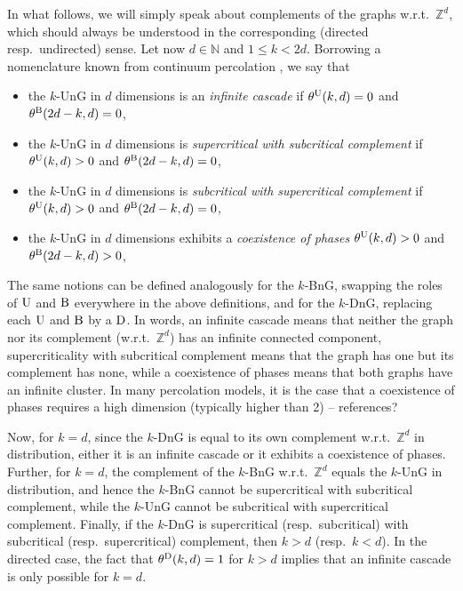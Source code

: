 \documentclass{article}
\newcommand{\N}{\mathbb{N}}
\theoremstyle{definition}
\newcommand{\1}{\mathbbm{1}}
\newcommand{\0}{\mathbf{o}}
\newcommand{\Z}{\mathbb{Z}}
\begin{document}
In what follows, we will simply speak about complements of the graphs w.r.t.\ $\Z^d$, which should always be understood in the corresponding (directed resp.\ undirected) sense. Let now $d \in \N$ and $1 \leq k < 2d$. Borrowing a nomenclature known from continuum percolation \cite[Section 7.3]{MeesterRoy1996}, we say that 
\begin{itemize}
    \item the $k$-UnG in $d$ dimensions is an \emph{infinite cascade} if $\theta^{\rm U}(k,d)=0$ and $\theta^{\rm B}(2d-k,d)=0$,
    \item the $k$-UnG in $d$ dimensions is \emph{supercritical with subcritical complement} if $\theta^{\rm U}(k,d)>0$ and $\theta^{\rm B}(2d-k,d)=0$,
    \item the $k$-UnG in $d$ dimensions is \emph{subcritical with supercritical complement} if $\theta^{\rm U}(k,d)>0$ and $\theta^{\rm B}(2d-k,d)=0$,
    \item the $k$-UnG in $d$ dimensions exhibits a \emph{coexistence of phases} $\theta^{\rm U}(k,d)>0$ and $\theta^{\rm B}(2d-k,d)>0$,
\end{itemize}
The same notions can be defined analogously for the $k$-BnG, swapping the roles of $\rm U$ and $\rm B$ everywhere in the above definitions, and for the $k$-DnG, replacing each $\rm U$ and $\rm B$ by a $\rm D$. In words, an infinite cascade means that neither the graph nor its complement (w.r.t.\ $\Z^d$) has an infinite connected component, supercriticality with subcritical complement means that the graph has one but its complement has none, while a coexistence of phases means that both graphs have an infinite cluster. \color{red} In many percolation models, it is the case that a coexistence of phases requires a high dimension (typically higher than 2) -- references? \color{black}

Now, for $k=d$, since the $k$-DnG is equal to its own complement w.r.t.\ $\Z^d$ in distribution, either it is an infinite cascade or it exhibits a coexistence of phases. Further, for $k=d$, the complement of the $k$-BnG w.r.t.\ $\Z^d$ equals the $k$-UnG in distribution, and hence the $k$-BnG cannot be supercritical with subcritical complement, while the $k$-UnG cannot be subcritical with supercritical complement. Finally, if the $k$-DnG is supercritical (resp.\ subcritical) with subcritical (resp.\ supercritical) complement, then $k>d$ (resp.\ $k<d$). In the directed case, the fact that $\theta^{\rm D}(k,d)=1$ for $k>d$ implies that an infinite cascade is only possible for $k=d$.
\end{document}

